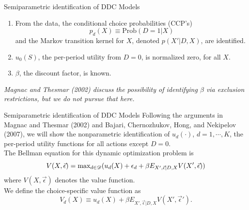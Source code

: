 \documentclass[aspectratio=169,11pt]{beamer}
\begin{document}
\begin{frame}{Semiparametric identification of DDC Models}
\begin{enumerate}
\item[6.] From the data, the \alert{conditional choice probabilities (CCP's)}  $$p_d(X) \equiv \text{Prob}(D=1|X)$$ and the Markov transition kernel for $X$, denoted $p(X'|D,X)$, are identified. 
\item[7.] $u_0(S)$, the per-period utility from $D = 0$, is normalized zero, for all $X$. \\
\item[8.] $\beta$, the discount factor, is known.
\end{enumerate}
\textit{Magnac and Thesmar (2002) discuss the possibility of identifying $\beta$ via exclusion restrictions, but we do not pursue that here.}
\end{frame}


\begin{frame}{Semiparametric identification of DDC Models}
Following the arguments in Magnac and Thesmar (2002) and Bajari, Chernozhukov, Hong, and Nekipelov (2007), we will show the nonparametric identification of $u_d(\cdot)$, $d = 1, \cdots , K$, the per-period utility functions for all actions except $D=0$.\\
\vspace{3mm}
The Bellman equation for this dynamic optimization problem is 
\begin{equation*}
V(X, \vec{\epsilon}) = \text{max}_{d \in \mathscr{D}} ( u_d(X) + \epsilon_d + \beta E_{X', \vec{\epsilon} | D, X} V(X', \vec{\epsilon}))
\end{equation*}
where $V(X, \vec{\epsilon})$ denotes the value function. \\
\vspace{0.5cm}
We define the choice-specific value function as
\begin{equation*}
V_d(X) \equiv u_d(X) + \beta E_{X', \vec{\epsilon}|D, X} V(X', \vec{\epsilon}').
\end{equation*}

\end{frame}
\end{document}
